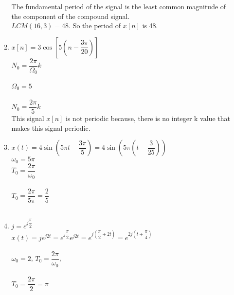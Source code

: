 \documentclass[10pt,a4paper, margin=1in]{article}
\begin{document}
\begin{enumerate}
\begin{enumerate}
\begin{enumerate}
    \end{enumerate}
    The fundamental period of the signal is the least common magnitude of the component of the compound signal.\\
    $LCM(16,3)=48$. So the period of $x[n]$ is 48.
    
    \item %
    
    $x[n]=3\cos[5(n-\dfrac{3\pi}{20})]$\\
    $N_0=\dfrac{2\pi}{\Omega_0}k$ \\ \\ $\Omega_0=5$\\ \\ 
    $N_0=\dfrac{2\pi}{5}k$\\
    This signal $x[n]$ is not periodic because, there is no integer k value that makes this signal periodic. 
    
    \item %
    
    $x(t) = 4\sin(5\pi t-\dfrac{3\pi}{5})=4\sin(5\pi(t-\dfrac{3}{25}))$\\
    $\omega_0=5\pi$\\  
    $T_0=\dfrac{2\pi}{\omega_0}$ \\ \\  $T_0=\dfrac{2\pi}{5\pi}=\dfrac{2}{5}$\\ \\
    
    \item %
    
    $j=e^{j\dfrac{\pi}{2}}$\\
    
    $x(t) = je^{j2t}=e^{j\dfrac{\pi}{2}}e^{j2t}=e^{j(\dfrac{\pi}{2}+2t)}=e^{2j(t+\dfrac{\pi}{4})}$\\
    \\
    $\omega_0=2$, $T_0=\dfrac{2\pi}{\omega_0}$, \\ \\ $T_0=\dfrac{2\pi}{2}=\pi$
    \end{enumerate}


\end{enumerate}
\end{document}
